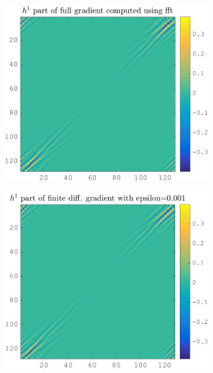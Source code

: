 \begin{figure}[!ht]\centering
\begin{subfigure}[b]{0.299\textwidth}\centering
\includegraphics[width=\textwidth]{figures/verif_gradient/gradient.png}
\end{subfigure}
\begin{subfigure}[b]{0.299\textwidth}\centering
\includegraphics[width=\textwidth]{figures/verif_gradient/finite-diff.png}
\end{subfigure}

\end{figure}
